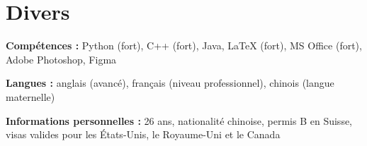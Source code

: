 \section{Divers}



        \begin{onecolentry}
            \textbf{Compétences :} Python (fort), C++ (fort), Java, LaTeX (fort), MS Office (fort), Adobe Photoshop, Figma
        \end{onecolentry}
        \vspace{0.2 cm}
        
        \begin{onecolentry}
            \textbf{Langues :} anglais (avancé), français (niveau professionnel), chinois (langue maternelle)
        \end{onecolentry}
        \vspace{0.2 cm}
        \begin{onecolentry}
            \textbf{Informations personnelles :} 26 ans, nationalité chinoise, permis B en Suisse, visas valides pour les États-Unis, le Royaume-Uni et le Canada
        \end{onecolentry}




    
